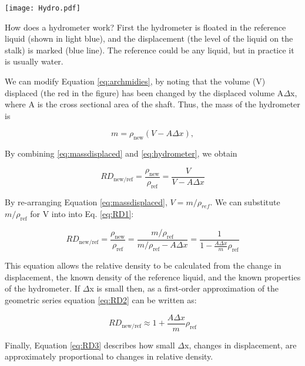 \documentclass{tufte-handout}
\begin{document}
\begin{marginfigure}
		\texttt{[image: Hydro.pdf]}
	\caption{How does a hydrometer work? First the hydrometer is floated in the reference liquid (shown in light blue), and the displacement (the level of the liquid on the stalk) is marked (blue line). The reference could be any liquid, but in practice it is usually water. }
	\label{fig:Hydro}
\end{marginfigure}

We can modify Equation \ref{eq:archmidies}, by noting that the volume (V) displaced (the red in the figure) has been changed by the displaced volume A$\Delta$x, where A is the cross sectional area of the shaft. Thus, the mass of the hydrometer is 

\begin{equation}\label{eq:hydrometer}
m = \rho_\mathrm{new} (V - A \Delta x),
\end{equation}

\noindent By combining \ref{eq:massdisplaced} and \ref{eq:hydrometer}, we obtain

\begin{equation}\label{eq:RD1}
RD_{\mathrm{new/ref}} = \frac{\rho_\mathrm{new}}{\rho_\mathrm{ref}} = \frac{V}{V - A \Delta x}
\end{equation}

\noindent By re-arranging Equation \ref{eq:massdisplaced}, $V = m/\rho_{ref}$. We can substitute $m/\rho_\mathrm{ref}$ for V into into Eq. \ref{eq:RD1}:

\begin{equation}\label{eq:RD2}
RD_{\mathrm{new/ref}} = \frac{\rho_\mathrm{new}}{\rho_\mathrm{ref}} = \frac{m/\rho_\mathrm{ref}}{m/\rho_\mathrm{ref} - A \Delta x} = \frac{1}{1 - \frac{A \Delta x}{m} \rho_\mathrm{ref}}
\end{equation}

This equation allows the relative density to be calculated from the change in displacement, the known density of the reference liquid, and the known properties of the hydrometer. If $\Delta$x is small then, as a first-order approximation of the geometric series equation \ref{eq:RD2} can be written as:

\begin{equation}\label{eq:RD3}
RD_\mathrm{new/ref} \approx 1 + \frac{A \Delta x}{m} \rho_\mathrm{ref}
\end{equation}

Finally, Equation \ref{eq:RD3} describes how small $\Delta$x, changes in displacement, are approximately proportional to changes in relative density.
\end{document}
